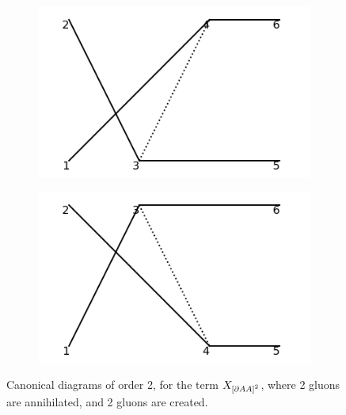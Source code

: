 \documentclass[11pt,a4paper,twoside,pdf]{article}
\numberwithin{equation}{section}
\begin{document}
\begin{figure}[h!]
\begin{subfigure}[t]{0.24\textwidth}
        \caption{ }
    \end{subfigure}
    \begin{subfigure}[t]{0.24\textwidth}
        \centering
        \includegraphics[width=\textwidth]{plots/canonical/order2/7.png}
        \caption{ }
    \end{subfigure}
    \begin{subfigure}[t]{0.24\textwidth}
        \centering
        \includegraphics[width=\textwidth]{plots/canonical/order2/8.png}
        \caption{ }
    \end{subfigure}
    \caption{Canonical diagrams of order 2, for the term $X_{\left[ \partial AA \right]^2}$, 
    where 2 gluons are annihilated, and 2 gluons are created.}
    \label{fig:cannonical2_2to2}
\end{figure}
\end{document}
